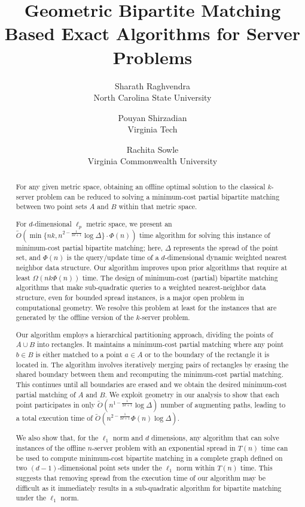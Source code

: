\documentclass[11pt,onecolumn]{article}
\title{\Large \bf Geometric Bipartite Matching Based Exact Algorithms for Server Problems}
\author{Sharath Raghvendra\\{\small North Carolina State University}
\and Pouyan Shirzadian\\{\small Virginia Tech}
\and Rachita Sowle\\{\small Virginia Commonwealth University}}
\date{}
\begin{document}
\maketitle


\begin{abstract}
For any given metric space, obtaining an offline optimal solution to the classical $k$-server problem can be reduced to solving a minimum-cost partial bipartite matching between two point sets $A$ and $B$ within that metric space. 

For $d$-dimensional $\ell_p$ metric space, we present an $\tilde{O}(\min\{nk, n^{2-\frac{1}{2d+1}}\log \Delta\}\cdot \Phi(n))$ time algorithm for solving this instance of minimum-cost partial bipartite matching; here, $\Delta$ represents the spread of the point set, and $\Phi(n)$ is the query/update time of a $d$-dimensional dynamic weighted nearest neighbor data structure. Our algorithm improves upon prior algorithms that require at least $\Omega(nk\Phi(n))$ time. The design of minimum-cost (partial) bipartite matching algorithms that make sub-quadratic queries to a weighted nearest-neighbor data structure, even for bounded spread instances, is a major open problem in computational geometry. We resolve this problem at least for the instances that are generated by the offline version of the $k$-server problem. 

Our algorithm employs a hierarchical partitioning approach, dividing the points of $A\cup B$ into rectangles. It maintains a minimum-cost partial matching where any point $b \in B$ is either matched to a point $a\in A$ or to the boundary of the rectangle it is located in. The algorithm involves iteratively merging pairs of rectangles by erasing the shared boundary between them and recomputing the minimum-cost partial matching. This continues until all boundaries are erased and we obtain the desired minimum-cost partial matching of $A$ and $B$. We exploit geometry in our analysis to show that each point participates in only $\tilde{O}(n^{1-\frac{1}{2d+1}}\log \Delta)$ number of augmenting paths, leading to a total execution time of $\tilde{O}(n^{2-\frac{1}{2d+1}}\Phi(n)\log \Delta)$.

We also show that, for the $\ell_1$ norm and $d$ dimensions, any algorithm that can solve instances of the offline $n$-server problem with an exponential spread in $T(n)$ time can be used to compute minimum-cost bipartite matching in a complete graph defined on two $(d-1)$-dimensional point sets under the $\ell_1$ norm within $T(n)$ time. This suggests that removing spread from the execution time of our algorithm may be difficult as it immediately results in a sub-quadratic algorithm for bipartite matching under the $\ell_1$ norm.  
\end{abstract}



% 


\end{document}
